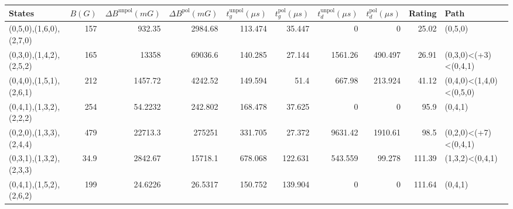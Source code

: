 \begin{tabular}{lrrrrrrrrl}
\hline
 {States}                &   {$B(G)$} &   {$\Delta B^{\text{unpol}}(mG)$} &   {$\Delta B^{\text{pol}}(mG)$} &   {$t^{\text{unpol}}_{g}(\mu s)$} &   {$t^{\text{pol}}_{g}(\mu s)$} &   {$t^{\text{unpol}}_{d}(\mu s)$} &   {$t^{\text{pol}}_{d}(\mu s)$} &   {Rating} & {Path}                  \\
\hline
 (0,5,0),(1,6,0),(2,7,0) &      157   &                          932.35   &                       2984.68   &                           113.474 &                          35.447 &                             0     &                           0     &      25.02 & (0,5,0)                 \\
 (0,3,0),(1,4,2),(2,5,2) &      165   &                        13358      &                      69036.6    &                           140.285 &                          27.144 &                          1561.26  &                         490.497 &      26.91 & (0,3,0)<(+3)<(0,4,1)    \\
 (0,4,0),(1,5,1),(2,6,1) &      212   &                         1457.72   &                       4242.52   &                           149.594 &                          51.4   &                           667.98  &                         213.924 &      41.12 & (0,4,0)<(1,4,0)<(0,5,0) \\
 (0,4,1),(1,3,2),(2,2,2) &      254   &                           54.2232 &                        242.802  &                           168.478 &                          37.625 &                             0     &                           0     &      95.9  & (0,4,1)                 \\
 (0,2,0),(1,3,3),(2,4,4) &      479   &                        22713.3    &                     275251      &                           331.705 &                          27.372 &                          9631.42  &                        1910.61  &      98.5  & (0,2,0)<(+7)<(0,4,1)    \\
 (0,3,1),(1,3,2),(2,3,3) &       34.9 &                         2842.67   &                      15718.1    &                           678.068 &                         122.631 &                           543.559 &                          99.278 &     111.39 & (1,3,2)<(0,4,1)         \\
 (0,4,1),(1,5,2),(2,6,2) &      199   &                           24.6226 &                         26.5317 &                           150.752 &                         139.904 &                             0     &                           0     &     111.64 & (0,4,1)                 \\

\end{tabular}
